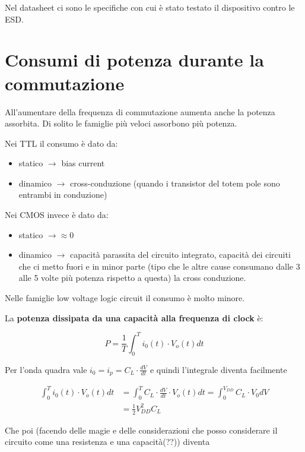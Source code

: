 \documentclass[
]{book}
\providecommand{\tightlist}{%
  \setlength{\itemsep}{0pt}\setlength{\parskip}{0pt}}
\begin{document}
Nel datasheet ci sono le specifiche con cui è stato testato il
dispositivo contro le ESD.

\section{Consumi di potenza durante la
commutazione}\label{consumi-di-potenza-durante-la-commutazione}

All'aumentare della frequenza di commutazione aumenta anche la potenza
assorbita. Di solito le famiglie più veloci assorbono più potenza.

Nei TTL il consumo è dato da:

\begin{itemize}
\tightlist
\item
  statico \(\rightarrow\) bias current
\item
  dinamico \(\rightarrow\) cross-conduzione (quando i transistor del
  totem pole sono entrambi in conduzione)
\end{itemize}

Nei CMOS invece è dato da:

\begin{itemize}
\tightlist
\item
  statico \(\rightarrow\approx 0\)
\item
  dinamico \(\rightarrow\) capacità parassita del circuito integrato,
  capacità dei circuiti che ci metto fuori e in minor parte (tipo che le
  altre cause consumano dalle 3 alle 5 volte più potenza rispetto a
  questa) la cross conduzione.
\end{itemize}

Nelle famiglie low voltage logic circuit il consumo è molto minore.

La \textbf{potenza dissipata da una capacità alla frequenza di clock} è:

\[P=\frac{1}{T}\int_{0}^{T}i_{0}(t)\cdot V_{o}(t)dt\]

Per l'onda quadra vale \(i_{0}=i_{p}=C_{L}\cdot\frac{dV}{dt}\) e quindi
l'integrale diventa facilmente

\begin{align*}
\int_{0}^{T}i_{0}(t)\cdot V_{o}(t)dt &=\int_{0}^{T}C_{L}\cdot\frac{dV}{dt}\cdot V_{o}(t)dt=\int_{0}^{V_{DD}}C_{L}\cdot V_{0}dV\\
&=\frac{1}{2}V_{DD}^{2}C_{L}
\end{align*}

Che poi (facendo delle magie e delle considerazioni che posso
considerare il circuito come una resistenza e una capacità(??)) diventa
\end{document}
